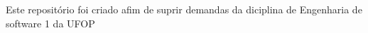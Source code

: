 Este repositório foi criado afim de suprir demandas da diciplina de Engenharia de software 1 da UFOP 